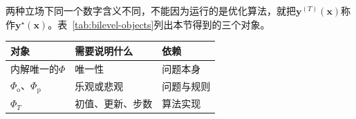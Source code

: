 两种立场下同一个数字含义不同，不能因为运行的是优化算法，就把$\bm{y}^{(T)}(\bm{x})$称作$\bm{y}^\star(\bm{x})$。表~\ref{tab:bilevel-objects}列出本节得到的三个对象。

\begin{BookInlineTable}
 \centering
 \begin{tabular}{lll}
  \toprule
  对象 & 需要说明什么 & 依赖\\
  \midrule
  内解唯一的$\Phi$ & 唯一性 & 问题本身\\
  $\Phi_{\mathrm{o}}$、$\Phi_{\mathrm{p}}$ & 乐观或悲观 & 问题与规则\\
  $\Phi_T$ & 初值、更新、步数 & 算法实现\\
  \bottomrule
 \end{tabular}
 \caption{外层目标的三种对象。内层无解的$\bm{x}$不属于前两行的讨论范围。}
 \label{tab:bilevel-objects}
\end{BookInlineTable}
